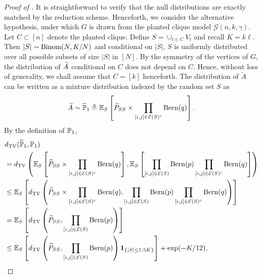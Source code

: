 \begin{proof}[Proof of ]
It is straightforward to verify that the null distributions are exactly matched by the reduction scheme. Henceforth, we 
consider the alternative hypothesis, under which $G$ is drawn from the planted clique model $\mathcal{G}(n,k,\gamma)$. Let $C \subset [n]$ denote the planted clique. Define $S=\cup_{t \in C} V_t$ and recall $K=k \ell$. Then $|S| \sim {\rm Binom}(N, K/N)$ and conditional on $|S|$, $S$ is uniformly distributed over all possible subsets of size $|S|$ in $[N]$.
By the symmetry of the vertices of $G$, the distribution of ${\widetilde{A}}$ conditional on $C$ does not depend on $C$. Hence, without loss of generality, we shall assume that $C=[k]$ henceforth.
The distribution of $ \widetilde{A}$ can be written as a mixture distribution indexed by the random set $S$ as
\begin{align*}
\widetilde{A} \sim \widetilde{\mathbb{P}}_1 \triangleq \mathbb{E}_{S} \left[{\widetilde{P}}_{SS} \times   \prod_{ [i,j] \in {\mathcal{E}}(S)^c } {\rm Bern}(q) \right].
\end{align*}
By the definition of $\mathbb{P}_1$,
\begin{align}
& d_{\rm TV} ( \widetilde{\mathbb{P}}_1, \mathbb{P}_1 ) \nonumber \\
&= d_{\rm TV} \left( \mathbb{E}_{S} \left[ {\widetilde{P}}_{SS} \times \prod_{[i,j] \in {\mathcal{E}}(S)^c } {\rm Bern}(q) \right],    \mathbb{E}_{S} \left[  \prod_{[i,j] \in {\mathcal{E}}(S) } {\rm Bern}(p) \prod_{[i,j] \in {\mathcal{E}}(S)^c } {\rm Bern}(q)   \right] \right) \nonumber \\
& \le \mathbb{E}_{S} \left[  d_{\rm TV} \left(  {\widetilde{P}}_{SS} \times \prod_{[i,j] \in {\mathcal{E}}(S)^c } {\rm Bern}(q), \prod_{[i,j] \in {\mathcal{E}}(S) } {\rm Bern}(p) \prod_{[i,j] \in {\mathcal{E}}(S)^c } {\rm Bern}(q)   \right) \right] \nonumber\\
& =\mathbb{E}_{S} \left[  d_{\rm TV} \left( {\widetilde{P}}_{SS}, \prod_{[i,j] \in {\mathcal{E}}(S) } {\rm Bern}(p)  \right) \right] \nonumber\\
& \le \mathbb{E}_{S} \left[  d_{\rm TV} \left( {\widetilde{P}}_{SS}, \prod_{[i,j] \in {\mathcal{E}}(S)} {\rm Bern}(p)  \right) {\mathbf{1}_{\left\{{ |S| \le 1.5K }\right\}}}\right] + \exp (-K/12), \label{eq:TotalvariationDistance}
\end{align}

\end{proof}
